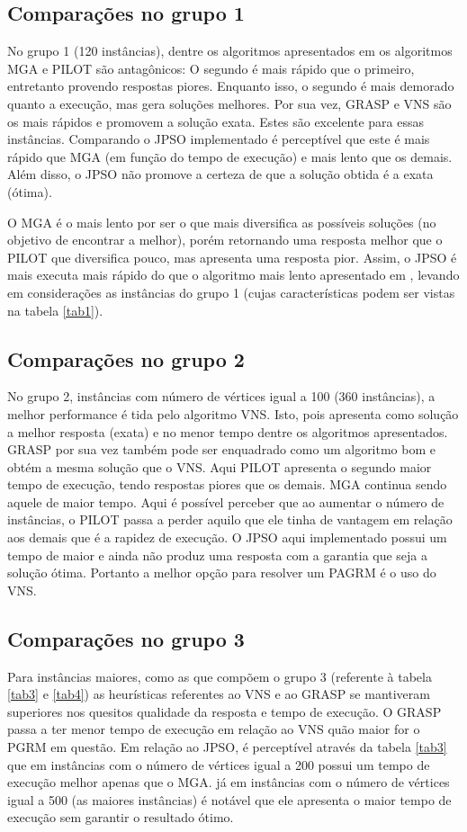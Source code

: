 \documentclass{sig-alternate-05-2015}
\begin{document}
\subsection{Comparações no grupo 1}
No grupo 1 (120 instâncias), dentre os algoritmos apresentados em \cite{consoli2009greedy} os algoritmos MGA e PILOT são antagônicos: O segundo é mais rápido que o primeiro, entretanto provendo respostas piores. Enquanto isso, o segundo é mais demorado quanto a execução, mas gera soluções melhores. Por sua vez, GRASP e VNS são os mais rápidos e promovem a solução exata. Estes são excelente para essas instâncias. Comparando o JPSO implementado é perceptível que este é mais rápido que MGA (em função do tempo de execução) e mais lento que os demais. Além disso, o JPSO não promove a certeza de que a solução obtida é a exata (ótima). 

O MGA é o mais lento por ser o que mais diversifica as possíveis soluções (no objetivo de encontrar a melhor), porém retornando uma resposta melhor que o PILOT que
diversifica pouco, mas apresenta uma resposta pior. Assim, o JPSO é mais executa mais rápido do que o algoritmo mais lento apresentado em \cite{consoli2009greedy} , levando em considerações as instâncias do grupo 1 (cujas características podem ser vistas na tabela \ref{tab1}).



\subsection{Comparações no grupo 2}
	No grupo 2, instâncias com número de vértices igual a 100 (360 instâncias), a melhor performance é tida pelo algoritmo VNS. Isto, pois apresenta como solução a melhor resposta (exata) e no menor tempo dentre os algoritmos apresentados. GRASP por sua vez também pode ser enquadrado como um algoritmo bom e obtém a mesma solução que o VNS. Aqui PILOT apresenta o segundo maior tempo de execução, tendo respostas piores que os demais. MGA continua sendo aquele de maior tempo. Aqui é possível perceber que ao aumentar o número de instâncias, o PILOT passa a perder aquilo que ele tinha de vantagem em relação aos demais que é a rapidez de execução. O JPSO aqui implementado possui um tempo de maior e ainda não produz uma resposta com a garantia que seja a solução ótima. Portanto a melhor opção para resolver um PAGRM é o uso do VNS.

\subsection{Comparações no grupo 3}
Para instâncias maiores, como as que compõem o grupo 3 (referente à tabela \ref{tab3} e \ref{tab4}) as heurísticas referentes ao VNS e ao GRASP se mantiveram superiores nos quesitos qualidade da resposta e tempo de execução. O GRASP passa a ter menor tempo de execução em relação ao VNS quão maior for o PGRM em questão. Em relação ao JPSO, é perceptível através da tabela \ref{tab3} que em instâncias com o número de vértices igual a 200 possui um tempo de execução melhor apenas que o MGA. já em instâncias com o número de vértices igual a 500 (as maiores instâncias) é notável que ele apresenta o maior tempo de execução sem garantir o resultado ótimo.
\end{document}
